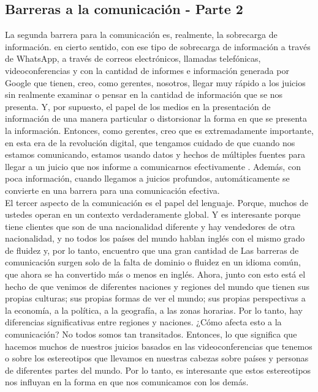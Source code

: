 \documentclass[10pt]{book}
\begin{document}
\subsection{Barreras a la comunicación - Parte 2}
La segunda barrera para la comunicación es, realmente, la sobrecarga de información. en cierto sentido, con ese tipo de sobrecarga de información a través de WhatsApp, a través de correos electrónicos, llamadas telefónicas, videoconferencias y con la cantidad de informes e información generada por Google que tienen, creo, como gerentes, nosotros, llegar muy rápido a los juicios sin realmente examinar o pensar en la cantidad de información que se nos presenta. Y, por supuesto, el papel de los medios en la presentación de información de una manera particular o distorsionar la forma en que se presenta la información. Entonces, como gerentes, creo que es extremadamente importante, en esta era de la revolución digital, que tengamos cuidado de que cuando nos estamos comunicando, estamos usando datos y hechos de múltiples fuentes para llegar a un juicio que nos informe a comunicarnos efectivamente . Además, con poca información, cuando llegamos a juicios profundos, automáticamente se convierte en una barrera para una comunicación efectiva.\\
El tercer aspecto de la comunicación es el papel del lenguaje. Porque, muchos de ustedes operan en un contexto verdaderamente global. Y es interesante porque tiene clientes que son de una nacionalidad diferente y hay vendedores de otra nacionalidad, y no todos los países del mundo hablan inglés con el mismo grado de fluidez y, por lo tanto, encuentro que una gran cantidad de Las barreras de comunicación surgen solo de la falta de dominio o fluidez en un idioma común, que ahora se ha convertido más o menos en inglés. Ahora, junto con esto está el hecho de que venimos de diferentes naciones y regiones del mundo que tienen sus propias culturas; sus propias formas de ver el mundo; sus propias perspectivas a la economía, a la política, a la geografía, a las zonas horarias. Por lo tanto, hay diferencias significativas entre regiones y naciones. ¿Cómo afecta esto a la comunicación? No todos somos tan transitados. Entonces, lo que significa que hacemos muchos de nuestros juicios basados en las videoconferencias que tenemos o sobre los estereotipos que llevamos en nuestras cabezas sobre países y personas de diferentes partes del mundo. Por lo tanto, es interesante que estos estereotipos nos influyan en la forma en que nos comunicamos con los demás.\\
\end{document}
